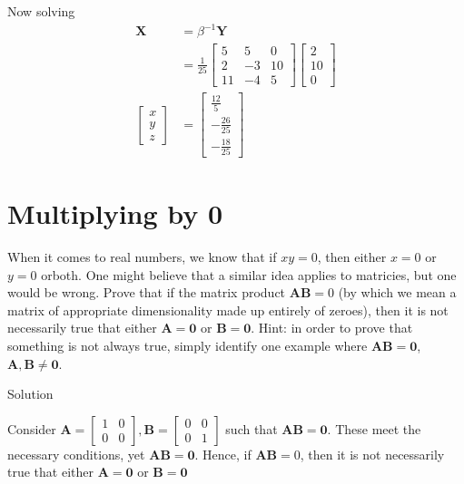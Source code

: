 \documentclass[12pt]{article}
\begin{document}
\begin{enumerate}
        Now solving
        \begin{align*}
            \mathbf{X}&= \beta^{-1} \mathbf{Y}
            \\ &= \frac{1}{25}\begin{bmatrix}
                    5& 5&0 
                    \\ 2&-3&10
                    \\  11&-4&5
                \end{bmatrix}\begin{bmatrix}
        2\\10\\0 \end{bmatrix}
                \\ \begin{bmatrix}
            x \\ y\\ z
        \end{bmatrix}&= \begin{bmatrix}
                    \frac{12}{5}
                    \\ -\frac{26}{25} 
                    \\ -\frac{18}{25}
                \end{bmatrix}
        \end{align*}
\end{enumerate}

\section{Multiplying by 0}
When it comes to real numbers, we know that if $xy=0$, then either $x=0$ or $y=0$ orboth. One might believe that a similar idea applies to matricies, but one would be wrong. Prove that if the matrix product $\mathbf{AB} = 0$ (by which we mean a matrix of appropriate dimensionality made up entirely of zeroes), then it is not necessarily true that either $\mathbf{A} = \mathbf{0}$ or $\mathbf{B} = \mathbf{0}$. Hint: in order to prove that something is not always true, simply identify one example where $\mathbf{AB} = \mathbf{0}$, $\mathbf{A},\mathbf{B} \neq \mathbf{0}$.

Solution

Consider $ \mathbf{A} = \begin{bmatrix}
    1&0 \\ 0&0\end{bmatrix},\mathbf{B} = \begin{bmatrix}
        0&0\\0&1    \end{bmatrix}$ such that $\mathbf{AB} = \mathbf{0}$. These meet the necessary conditions, yet $\mathbf{AB} = \mathbf{0}$. Hence, if $\mathbf{AB} = 0$, then it is not necessarily true that either $\mathbf{A} = \mathbf{0}$ or $\mathbf{B} = \mathbf{0}$
\end{document}
